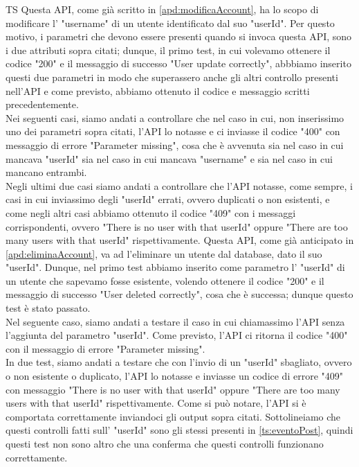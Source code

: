 \begin{listaPersonale}{TS}
                Questa API, come già scritto in \ref{apd:modificaAccount}, ha lo scopo di modificare l' "username" di un utente identificato dal suo "userId". Per questo motivo, i parametri che devono essere presenti quando si invoca questa API, sono i due attributi sopra citati; dunque, il primo test, in cui volevamo ottenere il codice "200" e il messaggio di successo "User update correctly", abbbiamo inserito questi due parametri in modo che superassero anche gli altri controllo presenti nell'API e come previsto, abbiamo ottenuto il codice e messaggio scritti precedentemente.
                \\
                Nei seguenti casi, siamo andati a controllare che nel caso in cui, non inserissimo uno dei parametri sopra citati, l'API lo notasse e ci inviasse il codice "400" con messaggio di errore "Parameter missing", cosa che è avvenuta sia nel caso in cui mancava "userId" sia nel caso in cui mancava "username" e sia nel caso in cui mancano entrambi.
                \\
                Negli ultimi due casi siamo andati a controllare che l'API notasse, come sempre, i casi in cui inviassimo degli "userId" errati, ovvero duplicati o non esistenti, e come negli altri casi abbiamo ottenuto il codice "409" con i messaggi corrispondenti, ovvero "There is no user with that userId" oppure "There are too many users with that userId" rispettivamente.
                Questa API, come già anticipato in \ref{apd:eliminaAccount}, va ad l'eliminare un utente dal database, dato il suo "userId". Dunque, nel primo test abbiamo inserito come parametro l' "userId" di un utente che sapevamo fosse esistente, volendo ottenere il codice "200" e il messaggio di successo "User deleted correctly", cosa che è successa; dunque questo test è stato passato.
                 \\
                Nel seguente caso, siamo andati a testare il caso in cui chiamassimo l'API senza l'aggiunta del parametro "userId".  Come previsto, l'API ci ritorna il codice "400" con il messaggio di errore "Parameter missing".
                 \\
                In due test, siamo andati a testare che con l'invio di un "userId" sbagliato, ovvero o non esistente o duplicato, l'API lo notasse e inviasse un codice di errore "409" con messaggio "There is no user with that userId" oppure "There are too many users with that userId" rispettivamente. Come si può notare, l'API si è comportata correttamente inviandoci gli output sopra citati. Sottolineiamo che questi controlli fatti sull' "userId" sono gli stessi presenti in \ref{ts:eventoPost}, quindi questi test non sono altro che una conferma che questi controlli funzionano correttamente.  \\

\end{listaPersonale}

